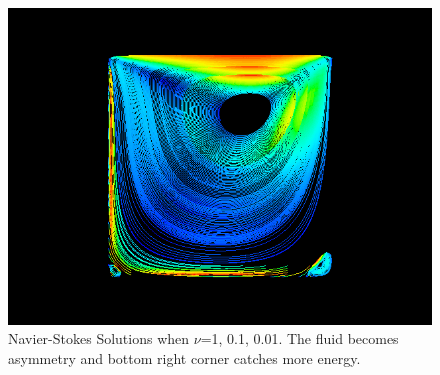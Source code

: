 \documentclass[a4paper]{article}
\begin{document}
\begin{figure}[h]
\includegraphics[scale = 0.2]{images/c.png}
\caption{Navier-Stokes Solutions when $\nu$=1, 0.1, 0.01. The fluid becomes asymmetry and bottom right corner catches more energy.}
\label{im::Navier-Stoke-solution}
\end{figure}
\end{document}
